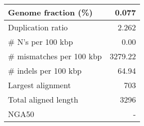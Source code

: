 \documentclass[12pt,a4paper]{article}
\begin{document}
\begin{table}[ht]
\begin{center}
\begin{tabular}{|l*{1}{|r}|}
Genome fraction (\%) & 0.077 \\ \hline
Duplication ratio & 2.262 \\ \hline
\# N's per 100 kbp & 0.00 \\ \hline
\# mismatches per 100 kbp & 3279.22 \\ \hline
\# indels per 100 kbp & 64.94 \\ \hline
Largest alignment & 703 \\ \hline
Total aligned length & 3296 \\ \hline
NGA50 & - \\ \hline
\end{tabular}
\end{center}
\end{table}
\end{document}

